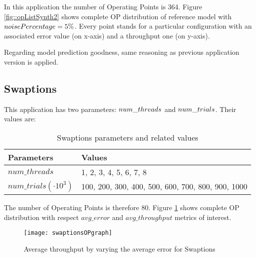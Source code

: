 In this application the number of Operating Points is 364. Figure \ref{fig::opListSynth2} shows complete OP distribution of reference model with $noise\-Per\-cent\-age = 5\%$. Every point stands for a particular configuration with an associated error value (on x-axis) and a throughput one (on y-axis).

Regarding model prediction goodness, same reasoning as previous application version is applied.


\subsection{Swaptions}

This application has two parameters: $num\_\-threads$ and $num\_\-trials$. Their values are:

\begin{table}[H]

    \centering

    \begin{tabular}{ll}
    
        \toprule
        Parameters & Values \\
        \midrule
        $num\_threads$ & 1, 2, 3, 4, 5, 6, 7, 8 \\
        $num\_trials (\cdot 10^3)$ & 100, 200, 300, 400, 500, 600, 700, 800, 900, 1000 \\
        \bottomrule 
    
    \end{tabular}

    \caption{Swaptions parameters and related values}

\end{table}

The number of Operating Points is therefore 80. Figure \ref{fig::swaptionsOPs} shows complete OP distribution with respect $avg\_error$ and $avg\_throughput$ metrics of interest.

\begin{figure}[ht]

    \centering

    \texttt{[image: swaptionsOPgraph]}

    \caption{Average throughput by varying the average error for Swaptions}

    \label{fig::swaptionsOPs}
    
\end{figure}





